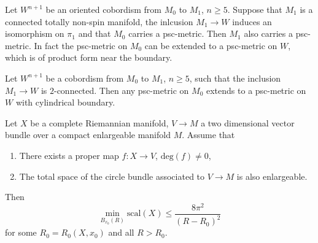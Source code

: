 \begin{theorem}
    \label{toc_draft:thm1}
    Let $W^{n+1}$ be an oriented cobordism from $M_0$ to $M_1$, $n \geq 5$. Suppose that $M_1$ is a connected totally non-spin manifold, the inlcusion $M_1 \to W$ induces an isomorphism on $\pi_1$ and that $M_0$ carries a psc-metric. Then $M_1$ also carries a psc-metric. In fact the psc-metric on $M_0$ can be extended to a psc-metric on $W$, which is of product form near the boundary. 
\end{theorem}

\begin{theorem}
    \label{toc_draft:thm2}
    Let $W^{n+1}$ be a cobordism from $M_0$ to $M_1$, $n \geq 5$, such that the inclusion $M_1 \to W$ is $2$-connected. Then any psc-metric on $M_0$ extends to a psc-metric on $W$ with cylindrical boundary.
\end{theorem}

\begin{theorem}
    \label{toc_draft:thm3}
    Let $X$ be a complete Riemannian manifold, $V \to M$ a two dimensional vector bundle over a compact enlargeable manifold $M$. Assume that 
    \begin{enumerate}[label=\roman*)]
        \item There exists a proper map $f \colon X \to V$, $\mathrm{deg}(f) \neq 0$,
        \item The total space of the circle bundle associated to $V \to M$ is also enlargeable.
    \end{enumerate}
    Then 
    \[
    \min_{B_{x_0}(R)} \mathrm{scal}(X) \leq \frac{8 \pi^2}{(R - R_0)^2}
    \]
    for some $R_0 = R_0(X,x_0)$ and all $R > R_0$.
\end{theorem}